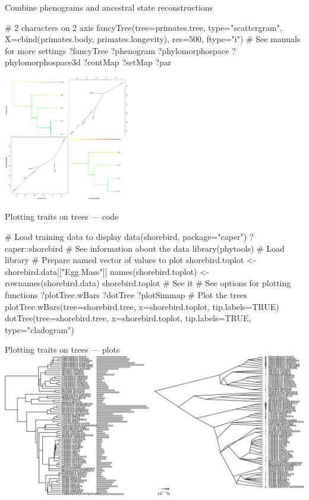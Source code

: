 \documentclass[compress, ucs, xelatex, 11pt, xcolor=svgnames,
	hyperref={
		bookmarks=true,
		unicode=true,
		colorlinks=true,
		pdftitle={Molecular data in R},
		plainpages=false,
		pdfauthor={Vojtech Zeisek},
		pdfsubject={Course about phylogeny and evolution in R},
		pdfcreator={XeLaTeX},
		pdfkeywords={R, evolution, phylogeny, molecular data},
		linkcolor=Tomato,
		anchorcolor=SaddleBrown,
		citecolor=Goldenrod,
		filecolor=DarkMagenta,
		menucolor=Sienna,
		urlcolor=DarkTurquoise,
		pdftex},
	url={hyphens, lowtilde} %
	]{beamer}
\begin{document}
\begin{frame}[fragile]{Combine phenograms and ancestral state reconstructions}
	\begin{multicols}{2}
		\begin{spluscode}
    # 2 characters on 2 axis
    fancyTree(tree=primates.tree,
      type="scattergram",
      X=cbind(primates.body,
      primates.longevity),
      res=500, ftype="i")
    # See manuals for more settings
    ?fancyTree
    ?phenogram
    ?phylomorphospace
    ?phylomorphospace3d
    ?contMap
    ?setMap
    ?par
		\end{spluscode}
		\begin{center}
			\includegraphics[height=5.5cm]{phenogram-ace.png}
		\end{center}
	\end{multicols}
\end{frame}

\begin{frame}[fragile]{Plotting traits on trees --- code}
	\begin{spluscode}
    # Load training data to display
    data(shorebird, package="caper")
    ?caper::shorebird # See information about the data
    library(phytools) # Load library
    # Prepare named vector of values to plot
    shorebird.toplot <- shorebird.data[["Egg.Mass"]]
    names(shorebird.toplot) <- rownames(shorebird.data)
    shorebird.toplot # See it
    # See options for plotting functions
    ?plotTree.wBars
    ?dotTree
    ?plotSimmap
    # Plot the trees
    plotTree.wBars(tree=shorebird.tree, x=shorebird.toplot,
      tip.labels=TRUE)
    dotTree(tree=shorebird.tree, x=shorebird.toplot, tip.labels=TRUE,
      type="cladogram")
	\end{spluscode}
\end{frame}

\begin{frame}{Plotting traits on trees --- plots}
	\includegraphics[width=\textwidth]{treeval.png}
\end{frame}
\end{document}
